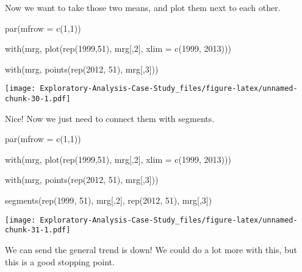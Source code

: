 \documentclass[
]{article}
\newenvironment{Shaded}{\begin{snugshade}}{\end{snugshade}}
\newcommand{\AttributeTok}[1]{\textcolor[rgb]{0.77,0.63,0.00}{#1}}
\newcommand{\DecValTok}[1]{\textcolor[rgb]{0.00,0.00,0.81}{#1}}
\newcommand{\FunctionTok}[1]{\textcolor[rgb]{0.00,0.00,0.00}{#1}}
\newcommand{\NormalTok}[1]{#1}
\begin{document}
Now we want to take those two means, and plot them next to each other.

\begin{Shaded}
\begin{Highlighting}[]
\FunctionTok{par}\NormalTok{(}\AttributeTok{mfrow =} \FunctionTok{c}\NormalTok{(}\DecValTok{1}\NormalTok{,}\DecValTok{1}\NormalTok{))}

\FunctionTok{with}\NormalTok{(mrg, }\FunctionTok{plot}\NormalTok{(}\FunctionTok{rep}\NormalTok{(}\DecValTok{1999}\NormalTok{,}\DecValTok{51}\NormalTok{), mrg[,}\DecValTok{2}\NormalTok{], }\AttributeTok{xlim =} \FunctionTok{c}\NormalTok{(}\DecValTok{1999}\NormalTok{, }\DecValTok{2013}\NormalTok{)))}

\FunctionTok{with}\NormalTok{(mrg, }\FunctionTok{points}\NormalTok{(}\FunctionTok{rep}\NormalTok{(}\DecValTok{2012}\NormalTok{, }\DecValTok{51}\NormalTok{), mrg[,}\DecValTok{3}\NormalTok{]))}
\end{Highlighting}
\end{Shaded}

\texttt{[image: Exploratory-Analysis-Case-Study\_files/figure-latex/unnamed-chunk-30-1.pdf]}

Nice! Now we just need to connect them with segments.

\begin{Shaded}
\begin{Highlighting}[]
\FunctionTok{par}\NormalTok{(}\AttributeTok{mfrow =} \FunctionTok{c}\NormalTok{(}\DecValTok{1}\NormalTok{,}\DecValTok{1}\NormalTok{))}

\FunctionTok{with}\NormalTok{(mrg, }\FunctionTok{plot}\NormalTok{(}\FunctionTok{rep}\NormalTok{(}\DecValTok{1999}\NormalTok{,}\DecValTok{51}\NormalTok{), mrg[,}\DecValTok{2}\NormalTok{], }\AttributeTok{xlim =} \FunctionTok{c}\NormalTok{(}\DecValTok{1999}\NormalTok{, }\DecValTok{2013}\NormalTok{)))}

\FunctionTok{with}\NormalTok{(mrg, }\FunctionTok{points}\NormalTok{(}\FunctionTok{rep}\NormalTok{(}\DecValTok{2012}\NormalTok{, }\DecValTok{51}\NormalTok{), mrg[,}\DecValTok{3}\NormalTok{]))}

\FunctionTok{segments}\NormalTok{(}\FunctionTok{rep}\NormalTok{(}\DecValTok{1999}\NormalTok{, }\DecValTok{51}\NormalTok{), mrg[,}\DecValTok{2}\NormalTok{], }\FunctionTok{rep}\NormalTok{(}\DecValTok{2012}\NormalTok{, }\DecValTok{51}\NormalTok{), mrg[,}\DecValTok{3}\NormalTok{])}
\end{Highlighting}
\end{Shaded}

\texttt{[image: Exploratory-Analysis-Case-Study\_files/figure-latex/unnamed-chunk-31-1.pdf]}

We can send the general trend is down! We could do a lot more with this,
but this is a good stopping point.
\end{document}
